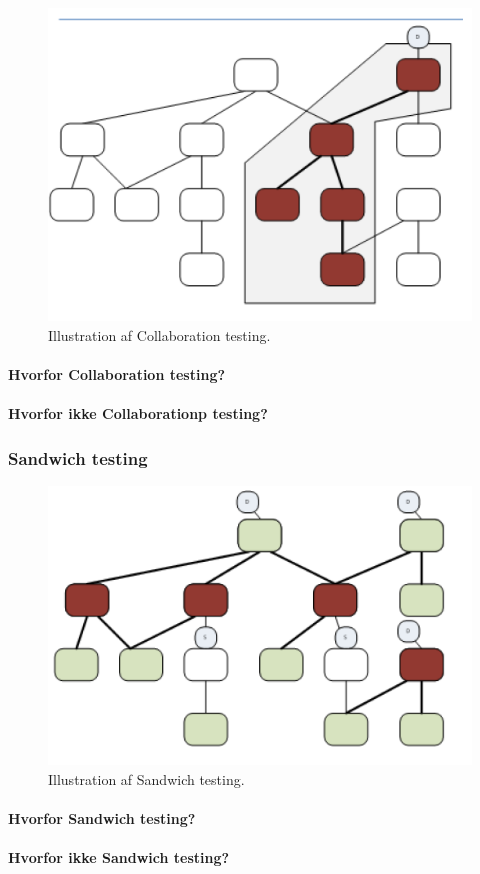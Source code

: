 \begin{figure}
\centering
\includegraphics[width=0.7\linewidth]{figs/collaborationTesting.PNG}
\caption{Illustration af Collaboration testing.}
\label{fig:collaborationTesting}
\end{figure}

\paragraph{Hvorfor Collaboration testing?}

\paragraph{Hvorfor ikke Collaborationp testing?}


\subsubsection{Sandwich testing}

\begin{figure}
\centering
\includegraphics[width=0.7\linewidth]{figs/sandwich.PNG}
\caption{Illustration af Sandwich testing.}
\label{fig:sandwich}
\end{figure}

\paragraph{Hvorfor Sandwich testing?}

\paragraph{Hvorfor ikke Sandwich testing?}